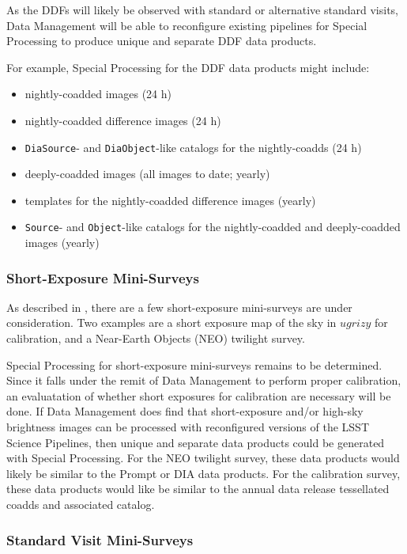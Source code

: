 As the DDFs will likely be observed with standard or alternative standard 
visits, Data Management will be able to reconfigure existing pipelines for
Special Processing to produce unique and separate DDF data products.

For example, Special Processing for the DDF data products might include:
\begin{itemize}
\item nightly-coadded images (24 h)
\item nightly-coadded difference images (24 h)
\item {\tt DiaSource}- and {\tt DiaObject}-like catalogs for the nightly-coadds (24 h)
\item deeply-coadded images (all images to date; yearly)
\item templates for the nightly-coadded difference images (yearly)
\item {\tt Source}- and {\tt Object}-like catalogs for the nightly-coadded and deeply-coadded images (yearly)
\end{itemize}

\subsubsection{Short-Exposure Mini-Surveys}

As described in , there are a few
short-exposure mini-surveys are under consideration.
Two examples are a short exposure map of the sky in $ugrizy$ for calibration,
and a Near-Earth Objects (NEO) twilight survey.

Special Processing for short-exposure mini-surveys remains to
be determined.
Since it falls under the remit of Data Management to perform proper calibration,
an evaluatation of whether short exposures for calibration are necessary
will be done. 
If Data Management does find that short-exposure and/or high-sky brightness images
can be processed with reconfigured versions of the LSST Science Pipelines,
then unique and separate data products could be generated with Special Processing.
For the NEO twilight survey, these data products would likely be similar to the
Prompt or DIA data products.
For the calibration survey, these data products would like be similar to the
annual data release tessellated coadds and associated catalog.

\subsubsection{Standard Visit Mini-Surveys}

